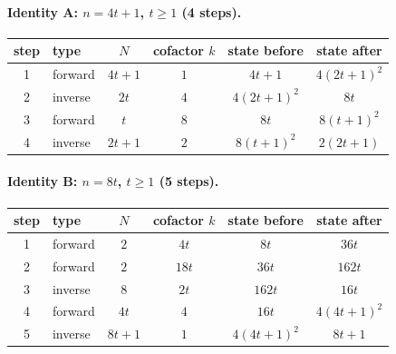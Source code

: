 \paragraph{Identity A: $n=4t+1$, $t\ge 1$ (4 steps).}
\begin{center}\footnotesize
\begin{tabular}{@{}clcccc@{}}\toprule
step & type & $N$ & cofactor $k$ & state before & state after \\ \midrule
1 & forward & $4 t + 1$ & $1$ & $4 t + 1$ & $4 \left(2 t + 1\right)^{2}$ \\
2 & inverse & $2 t$ & $4$ & $4 \left(2 t + 1\right)^{2}$ & $8 t$ \\
3 & forward & $t$ & $8$ & $8 t$ & $8 \left(t + 1\right)^{2}$ \\
4 & inverse & $2 t + 1$ & $2$ & $8 \left(t + 1\right)^{2}$ & $2 \left(2 t + 1\right)$ \\
\bottomrule\end{tabular}\end{center}
\paragraph{Identity B: $n=8t$, $t\ge 1$ (5 steps).}
\begin{center}\footnotesize
\begin{tabular}{@{}clcccc@{}}\toprule
step & type & $N$ & cofactor $k$ & state before & state after \\ \midrule
1 & forward & $2$ & $4 t$ & $8 t$ & $36 t$ \\
2 & forward & $2$ & $18 t$ & $36 t$ & $162 t$ \\
3 & inverse & $8$ & $2 t$ & $162 t$ & $16 t$ \\
4 & forward & $4 t$ & $4$ & $16 t$ & $4 \left(4 t + 1\right)^{2}$ \\
5 & inverse & $8 t + 1$ & $1$ & $4 \left(4 t + 1\right)^{2}$ & $8 t + 1$ \\
\bottomrule\end{tabular}\end{center}
